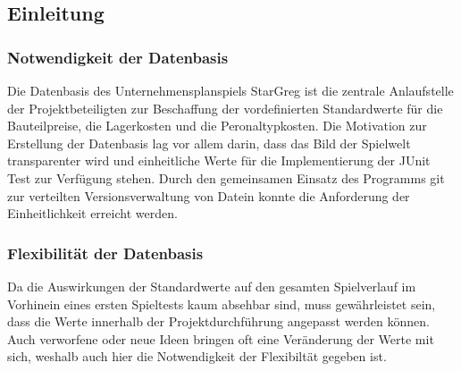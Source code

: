 \subsection{Einleitung}
\label{sub:spielwelt-datenbasis-einleitung}

\subsubsection{Notwendigkeit der Datenbasis}
\label{subsub:spielwelt-datenbasis-einleitung-notwendigkeit}

Die Datenbasis des Unternehmensplanspiels StarGreg ist die zentrale Anlaufstelle der Projektbeteiligten zur Beschaffung der vordefinierten Standardwerte für die Bauteilpreise, die Lagerkosten und die Peronaltypkosten. Die Motivation zur Erstellung der Datenbasis lag vor allem darin, dass das Bild der Spielwelt transparenter wird und einheitliche Werte für die Implementierung der JUnit Test zur Verfügung stehen. Durch den gemeinsamen Einsatz des Programms git zur verteilten Versionsverwaltung von Datein konnte die Anforderung der Einheitlichkeit erreicht werden. 

\subsubsection{Flexibilität der Datenbasis}
\label{subsub:spielwelt-datenbasis-einleitung-fleibilität}

Da die Auswirkungen der Standardwerte auf den gesamten Spielverlauf im Vorhinein eines ersten Spieltests kaum absehbar sind, muss gewährleistet sein, dass die Werte innerhalb der Projektdurchführung angepasst werden können. Auch verworfene oder neue Ideen bringen oft eine Veränderung der Werte mit sich, weshalb auch hier die Notwendigkeit der Flexibiltät gegeben ist.

